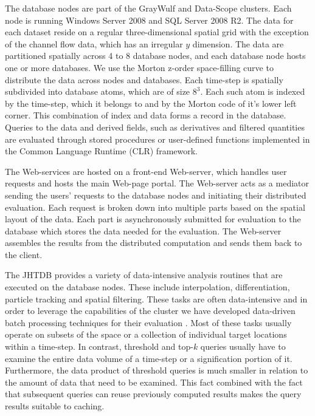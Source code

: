 \documentclass{sig-alternate}
\begin{document}
The database nodes are part of the GrayWulf \cite{Szalay} and Data-Scope \cite{DataScope} clusters. Each node
is running Windows Server 2008 and SQL Server 2008 R2. The data for each dataset reside on a regular three-dimensional spatial grid with the
exception of the channel flow data, which has an irregular $y$ dimension. The data are partitioned spatially across 4 to 8
database nodes, and each database node hosts one or more databases. We use the Morton z-order space-filling
curve to distribute the data across nodes and databases. Each time-step is spatially subdivided
into database atoms, which are of size $8^3$. Each such atom is indexed by the time-step, which it belongs to and
by the Morton code of it's lower left corner. This combination of index and data forms a record in the database.
Queries to the data and derived fields, such as derivatives and filtered quantities are evaluated through
stored procedures or user-defined functions implemented in the Common Language Runtime (CLR) framework.

The Web-services are hosted on a front-end Web-server, which handles user requests and hosts the main Web-page portal.
The Web-server acts as a mediator sending the users' requests to the database nodes and initiating their distributed evaluation. 
Each request is broken down into multiple parts based on the spatial layout of the data. Each part is asynchronously submitted for evaluation 
to the database which stores the data needed for the evaluation.
The Web-server assembles the results from the distributed computation and sends them back to the client.

The JHTDB provides a variety of data-intensive analysis routines that are executed on the database nodes. These include interpolation, 
differentiation, particle tracking and spatial filtering. These tasks are often data-intensive and in order to leverage the capabilities of the cluster we
have developed data-driven batch processing techniques for their evaluation \cite{KanovSC11, KanovSC12}. Most of these tasks usually operate on subsets
of the space or a collection of individual target locations within a time-step. In contrast, threshold and top-$k$ queries usually have to examine the entire 
data volume of a time-step or a signification portion of it. Furthermore, the data product of threshold queries is much smaller in relation to the amount of 
data that need to be examined. This fact combined with the fact that subsequent queries can reuse 
previously computed results makes the query results suitable to caching. 
\end{document}
